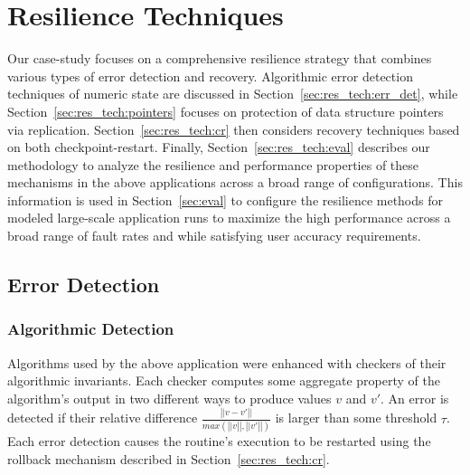 \documentclass[10pt, conference, compsocconf]{IEEEtran}
\begin{document}
\section{Resilience Techniques}
\vspace{-10pt}
\label{sec:res_tech}

Our case-study focuses on a comprehensive resilience strategy that combines various types of error detection and recovery.
Algorithmic error detection techniques of numeric state are discussed in Section~\ref{sec:res_tech:err_det}, while Section~\ref{sec:res_tech:pointers} focuses on protection of data structure pointers via replication.
Section~\ref{sec:res_tech:cr} then considers recovery techniques based on both checkpoint-restart.%
Finally, Section~\ref{sec:res_tech:eval} describes our methodology to analyze the resilience and performance properties of these mechanisms in the above applications across a broad range of configurations.
This information is used in Section~\ref{sec:eval} to configure the resilience methods for modeled large-scale application runs to maximize the high performance across a broad range of fault rates and while satisfying user accuracy requirements.

\vspace{-10pt}
\subsection{Error Detection}
\vspace{-10pt}
\label{sec:res_tech:err_det}

\subsubsection{Algorithmic Detection}
\vspace{-10pt}
\label{sec:res_tech:err_det:algo}

Algorithms used by the above application were enhanced with checkers of their algorithmic invariants.
Each checker computes some aggregate property of the algorithm's output in two different ways to produce values $v$ and $v'$.
An error is detected if their relative difference $\frac{\left|| v-v' \right||}{max(\left||v\right||, \left||v'\right||)}$ is larger than some threshold $\tau$.
Each error detection causes the routine's execution to be restarted using the rollback mechanism described in Section~\ref{sec:res_tech:cr}.
\end{document}
